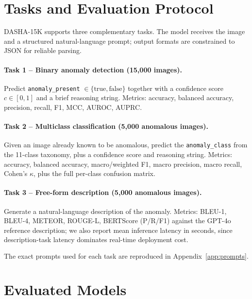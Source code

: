 \documentclass{article}
\newcommand{\bench}{\textsc{DASHA-15K}\xspace}
\begin{document}
\section{Tasks and Evaluation Protocol}
\label{sec:tasks}

\bench supports three complementary tasks. The model receives the
image and a structured natural-language prompt; output formats are
constrained to JSON for reliable parsing.

\paragraph{Task 1 -- Binary anomaly detection (15{,}000 images).}
Predict \texttt{anomaly\_present} $\in \{\text{true},
\text{false}\}$ together with a confidence score $c \in [0,1]$ and a
brief reasoning string. Metrics: accuracy, balanced accuracy,
precision, recall, F1, MCC, AUROC, AUPRC.

\paragraph{Task 2 -- Multiclass classification (5{,}000 anomalous images).}
Given an image already known to be anomalous, predict the
\texttt{anomaly\_class} from the 11-class taxonomy, plus a confidence
score and reasoning string. Metrics: accuracy, balanced accuracy,
macro/weighted F1, macro precision, macro recall, Cohen's $\kappa$,
plus the full per-class confusion matrix.

\paragraph{Task 3 -- Free-form description (5{,}000 anomalous images).}
Generate a natural-language description of the anomaly. Metrics:
BLEU-1, BLEU-4, METEOR, ROUGE-L, BERTScore (P/R/F1) against the
GPT-4o reference description; we also report mean inference latency
in seconds, since description-task latency dominates real-time
deployment cost.

The exact prompts used for each task are reproduced in
Appendix~\ref{app:prompts}.

\section{Evaluated Models}
\label{sec:models}
\end{document}
